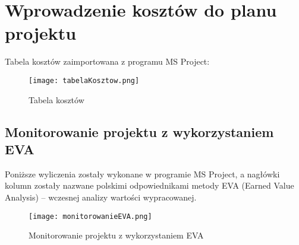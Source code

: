 \clearpage


\section{Wprowadzenie kosztów do planu projektu}

Tabela kosztów zaimportowana z programu MS Project:

\begin{figure}[!h]
\centering
\texttt{[image: tabelaKosztow.png]}
\caption{Tabela kosztów}
\label{fig:tabelaKosztow}
\end{figure}

\clearpage


\begin{landscape}

\section{Monitorowanie projektu z wykorzystaniem EVA}

Poniższe wyliczenia zostały wykonane w programie MS Project, a nagłówki kolumn zostały nazwane polskimi odpowiednikami metody EVA (Earned Value Analysis) – wczesnej analizy wartości wypracowanej.

\begin{figure}[!h]
\centering
\texttt{[image: monitorowanieEVA.png]}
\caption{Monitorowanie projektu z wykorzystaniem EVA}
\label{fig:monitorowanieEVA}
\end{figure}

\end{landscape}
